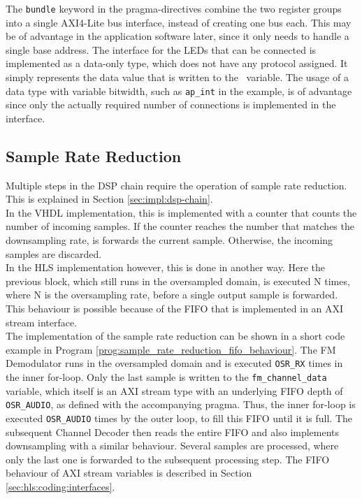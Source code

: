 The \texttt{bundle} keyword in the pragma-directives combine the two register groups into a single AXI4-Lite bus interface, instead of creating one bus each.
This may be of advantage in the application software later, since it only needs to handle a single base address.
The interface for the LEDs that can be connected is implemented as a data-only type, which does not have any protocol assigned.
It simply represents the data value that is written to the \cplusplus\ variable.
The usage of a data type with variable bitwidth, such as \texttt{ap\_int} in the example, is of advantage since only the actually required number of connections is implemented in the interface.

\subsection{Sample Rate Reduction}

Multiple steps in the DSP chain require the operation of sample rate reduction.
This is explained in Section \ref{sec:impl:dsp-chain}.\\

In the VHDL implementation, this is implemented with a counter that counts the number of incoming samples.
If the counter reaches the number that matches the downsampling rate, is forwards the current sample.
Otherwise, the incoming samples are discarded.\\

In the HLS implementation however, this is done in another way.
Here the previous block, which still runs in the oversampled domain, is executed N times, where N is the oversampling rate, before a single output sample is forwarded.
This behaviour is possible because of the FIFO that is implemented in an AXI stream interface.\\

The implementation of the sample rate reduction can be shown in a short code example in Program \ref{prog:sample_rate_reduction_fifo_behaviour}.
The FM Demodulator runs in the oversampled domain and is executed \texttt{OSR\_RX} times in the inner for-loop.
Only the last sample is written to the \texttt{fm\_channel\_data} variable, which itself is an AXI stream type with an underlying FIFO depth of \texttt{OSR\_AUDIO}, as defined with the accompanying pragma.
Thus, the inner for-loop is executed \texttt{OSR\_AUDIO} times by the outer loop, to fill this FIFO until it is full.
The subsequent Channel Decoder then reads the entire FIFO and also implements downsampling with a similar behaviour.
Several samples are processed, where only the last one is forwarded to the subsequent processing step.
The FIFO behaviour of AXI stream variables is described in Section \ref{sec:hls:coding:interfaces}.


